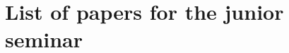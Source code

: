 \documentclass[A4paper, 12pt]{article}
\begin{document}
\section*{List of papers for the junior seminar}

\begin{enumerate}
  
\end{enumerate}
\end{document}
